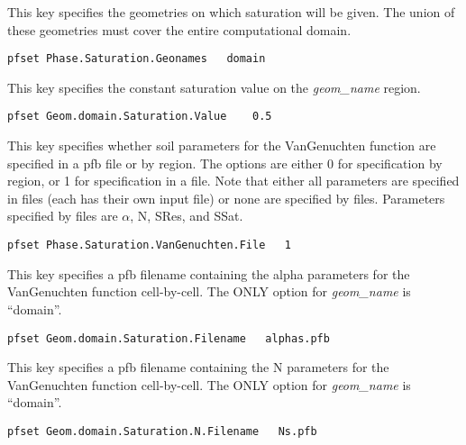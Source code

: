 {This key specifies the geometries on which saturation will be given.
The union of these geometries must cover the entire computational domain.}
\begin{display}\begin{verbatim}
pfset Phase.Saturation.Geonames   domain
\end{verbatim}\end{display}

{This key specifies the constant saturation value on the {\em geom\_name} 
region. }
\begin{display}\begin{verbatim}
pfset Geom.domain.Saturation.Value    0.5
\end{verbatim}\end{display}

{This key specifies whether soil parameters for the VanGenuchten function are
specified in a pfb file or by region.  The options are either 0 for
specification by region, or 1 for specification in a file.  Note that either
all parameters are specified in files (each has their own input file) or none
are specified by files.  Parameters specified by files are $\alpha$, N, SRes,
and SSat.}
\begin{display}\begin{verbatim}
pfset Phase.Saturation.VanGenuchten.File   1
\end{verbatim}\end{display}

{This key specifies a pfb filename containing the alpha parameters for the
VanGenuchten function cell-by-cell.  The ONLY option for {\em geom\_name} is
``domain''.}
\begin{display}\begin{verbatim}
pfset Geom.domain.Saturation.Filename   alphas.pfb
\end{verbatim}\end{display}

{This key specifies a pfb filename containing the N parameters for the
VanGenuchten function cell-by-cell.  The ONLY option for {\em geom\_name} is
``domain''.}
\begin{display}\begin{verbatim}
pfset Geom.domain.Saturation.N.Filename   Ns.pfb
\end{verbatim}\end{display}

